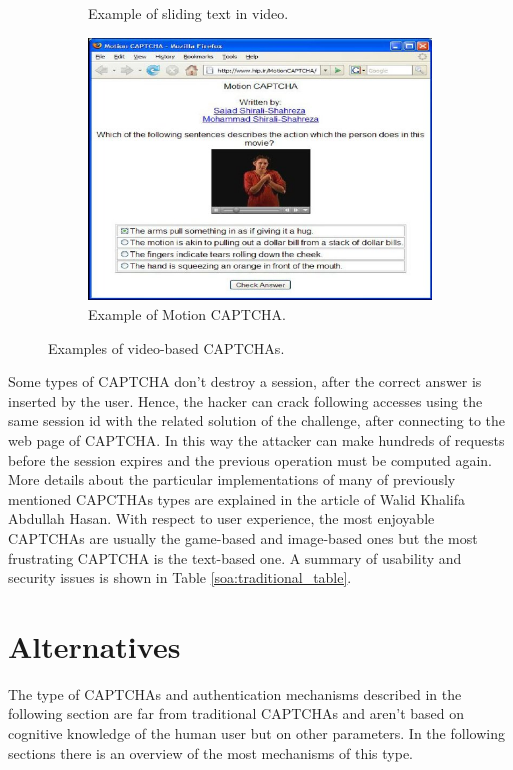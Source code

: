 \begin{itemize}
{\begin{figure}[h]
\begin{subfigure}[b]{0.48\textwidth}
         \caption{\footnotesize{Example of sliding text in video.}}
         \label{soa:video}
     \end{subfigure}
     \hfill
     \begin{subfigure}[b]{0.48\textwidth}
         \centering
         \includegraphics[width=\linewidth]{Images/StateOfArt/video_CAPTCHA2}
         \caption{\footnotesize{Example of Motion CAPTCHA\cite{Motion_CAPTCHA}.}}
        \label{soa:video2}
     \end{subfigure}
     \caption{\footnotesize{Examples of video-based CAPTCHAs.}}
\end{figure}
}
\end{itemize}
Some types of CAPTCHA don't destroy a session, after the correct answer is inserted by the user\cite{text_audio}. Hence, the hacker can crack following accesses using the same session id with the related solution of the challenge, after connecting to the web page of CAPTCHA. In this way the attacker can make hundreds of requests before the session expires and the previous operation must be computed again.\\
More details about the particular implementations of many of previously mentioned CAPCTHAs types are explained in the article of Walid Khalifa Abdullah Hasan\cite{survey_advanced_CAPTCHA}. With respect to user experience, the most enjoyable CAPTCHAs are usually the game-based and image-based ones but the most frustrating CAPTCHA is the text-based one\cite{usability_CAPTCHA}. A summary of usability and security issues is shown in Table \ref{soa:traditional_table}.

\section{Alternatives}
The type of CAPTCHAs and authentication mechanisms described in the following section are far from traditional CAPTCHAs and aren't based on cognitive knowledge of the human user but on other parameters. In the following sections there is an overview of the most mechanisms of this type.

